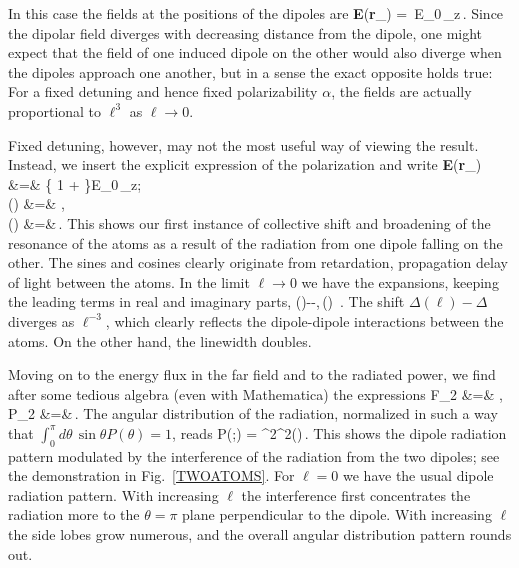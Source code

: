 In this case the fields at the positions of the dipoles are
\beq
{\bf E}({\bf r}_\pm) = \,E_0\,_z\,.
\label{FOD}
\eeq
Since the dipolar field diverges with decreasing distance from the dipole, one might expect that the field of one induced dipole on the other would also diverge when the dipoles approach one another, but in a sense the exact opposite holds true: For a fixed detuning and hence fixed polarizability $\alpha$, the fields are actually proportional to $\ell^3$ as $\ell\rightarrow0$.

Fixed detuning, however, may not the most useful way of viewing the result. Instead, we insert the explicit expression of the polarization and write
\bea
{\bf E}({\bf r}_\pm) &=& \left\{
1 + 
\right\}E_0\,_z;\\
\Delta(\ell) &=&    \gamma,\nonumber\\
\gamma(\ell) &=&\gamma \,.
\label{GAMMAL}
\eea
This shows our first instance of collective shift and broadening of the resonance of the atoms as a result of the radiation from one dipole falling on the other. The sines and cosines clearly originate from retardation, propagation delay of light between the atoms. In the limit $\ell\rightarrow0$ we have the expansions, keeping the leading terms in real and imaginary parts,
\beq
\Delta(\ell)-\Delta \simeq -,\,\gamma(\ell) \gamma\,.
\eeq
The shift $\Delta(\ell)-\Delta$ diverges as  $\ell^{-3}$, which clearly reflects the dipole-dipole interactions between the atoms. On the other hand, the linewidth doubles.

Moving on to the energy flux in the far field and to the radiated power, we find after some tedious algebra (even with Mathematica) the expressions
\bea
F_2 &=& ,\\
P_2 &=&\,.
\eea
The angular distribution of the radiation, normalized in such a way that $\int_0^\pi d\theta\,\sin\theta P(\theta)=1$, reads
\beq
P(\theta;\ell) = \frac{3\gamma}{2\gamma(\ell)}\cos^2 \sin ^2(\theta )\,.
\eeq
This shows the dipole radiation pattern modulated by the interference of the radiation from the two dipoles; see the demonstration in Fig.~\ref{TWOATOMS}. For $\ell=0$ we have the usual dipole radiation pattern. With increasing $\ell$ the interference first concentrates the radiation more to the $\theta=\pi$ plane perpendicular to the dipole. With increasing $\ell$ the side lobes grow numerous, and the overall angular distribution pattern rounds out.

